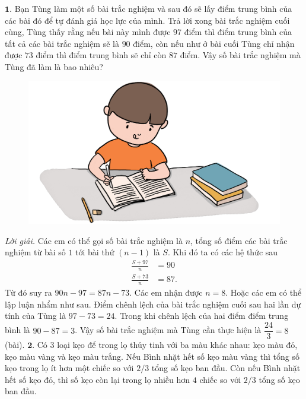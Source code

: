 \begin{multicols}{2}
	$\pmb{1.}$ Bạn Tùng làm một số bài trắc nghiệm và sau đó sẽ lấy điểm trung bình của các bài đó để tự đánh giá học lực của mình. Trả lời xong bài trắc nghiệm cuối cùng, Tùng thấy rằng nếu bài này mình được $97$ điểm thì điểm trung bình của tất cả các bài trắc nghiệm sẽ là $90$ điểm, còn nếu như ở bài cuối Tùng chỉ nhận được $73$ điểm thì điểm trung bình sẽ chỉ còn $87$ điểm. Vậy số bài trắc nghiệm mà Tùng đã làm là bao nhiêu?
	\begin{figure}[H]
		\centering
		\vspace*{-10pt}
		\captionsetup{labelformat= empty, justification=centering}
		\includegraphics[width=0.98\linewidth]{Pi12_Bai1}
		\vspace*{-5pt}
	\end{figure}
	\textit{Lời giải.} 	Các em có thể gọi số bài trắc nghiệm là $n$, tổng số điểm các bài trắc nghiệm  từ bài số $1$ tới bài thứ $(n-1)$ là $S$. Khi đó ta có các hệ thức sau
	\begin{align*}
		\frac{S + 97}{n} &= 90\\
		\frac{S + 73}{n} &= 87.
	\end{align*}
	Từ đó suy ra $90n-97= 87n-73$. Các em nhận được $n=8$.
	\vskip 0.1cm
	Hoặc các em có thể lập luận nhẩm như sau. Điểm chênh lệch của bài trắc nghiệm  cuối sau hai lần dự tính của Tùng là $97-73 = 24$. Trong khi chênh lệch của hai điểm điểm trung bình là $90-87=3$. Vậy số bài trắc nghiệm  mà Tùng cần thực hiện là \linebreak$\dfrac{24}{3}=8$ (bài).
	\vskip 0.1cm
	$\pmb{2.}$ Có $3$ loại kẹo để trong lọ thủy tinh với ba màu khác nhau: kẹo màu đỏ, kẹo màu vàng và kẹo màu trắng. Nếu Bình nhặt hết số kẹo màu vàng thì tổng số kẹo trong lọ ít hơn một chiếc so với $2/3$ tổng số kẹo ban đầu. Còn nếu Bình nhặt hết số kẹo đỏ, thì số kẹo còn lại trong lọ nhiều hơn $4$ chiếc so với $2/3$ tổng số kẹo ban đầu.

\end{multicols}
